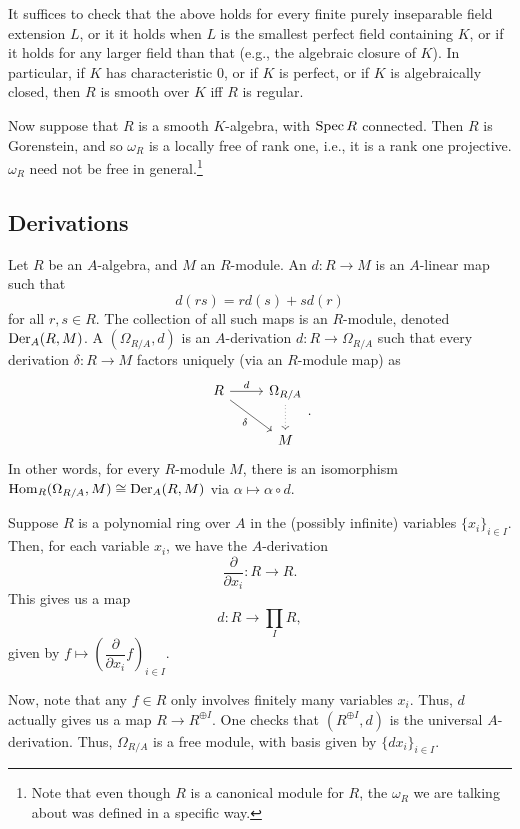 \documentclass[12pt]{article}
\begin{document}
It suffices to check that the above holds for every finite purely inseparable field extension $L$, or it it holds when $L$ is the smallest perfect field containing $K$, or if it holds for any larger field than that (e.g., the algebraic closure of $K$). \newline
In particular, if $K$ has characteristic $0$, or if $K$ is perfect, or if $K$ is algebraically closed, then $R$ is smooth over $K$ iff $R$ is regular.

Now suppose that $R$ is a smooth $K$-algebra, with $\operatorname{Spec} R$ connected. Then $R$ is Gorenstein, and so $\omega_{R}$ is a locally free of rank one, i.e., it is a rank one projective. $\omega_{R}$ need not be free in general.\footnote{Note that even though $R$ is a canonical module for $R$, the $\omega_{R}$ we are talking about was defined in a specific way.} 

\subsection{Derivations}

Let $R$ be an $A$-algebra, and $M$ an $R$-module. An  $d : R \to M$ is an $A$-linear map such that
\begin{equation*} 
	d(rs) = r d(s) + s d(r)
\end{equation*}
for all $r, s \in R$. The collection of all such maps is an $R$-module, denoted $\operatorname{Der}_{A}(R, M)$. \newline
A  $(\Omega_{R/A}, d)$ is an $A$-derivation $d : R \to \Omega_{R/A}$ such that every derivation $\delta : R \to M$ factors uniquely (via an $R$-module map) as
\begin{equation*} 
	\begin{tikzcd}
		R \arrow[r, "d"] \arrow[rd, "\delta"'] & \Omega_{R/A} \arrow[d, dotted] \\
		& M
	\end{tikzcd}.
\end{equation*}
In other words, for every $R$-module $M$, there is an isomorphism $\operatorname{Hom}_{R}(\Omega_{R/A}, M) \cong \operatorname{Der}_{A}(R, M)$ via $\alpha \mapsto \alpha \circ d$.

\begin{ex}
	Suppose $R$ is a polynomial ring over $A$ in the (possibly infinite) variables $\{x_{i}\}_{i \in I}$. Then, for each variable $x_{i}$, we have the $A$-derivation
	\begin{equation*} 
		\dfrac{\partial}{\partial x_{i}} : R \to R.
	\end{equation*}
	This gives us a map
	\begin{equation*} 
		d : R \to \prod_{I} R,
	\end{equation*}
	given by $f \mapsto \left(\dfrac{\partial}{\partial x_{i}} f\right)_{i \in I}$.

	Now, note that any $f \in R$ only involves finitely many variables $x_{i}$. Thus, $d$ actually gives us a map $R \to R^{\oplus I}$. One checks that $(R^{\oplus I}, d)$ is the universal $A$-derivation. Thus, $\Omega_{R/A}$ is a free module, with basis given by $\{d x_{i}\}_{i \in I}$.
\end{ex}
\end{document}
